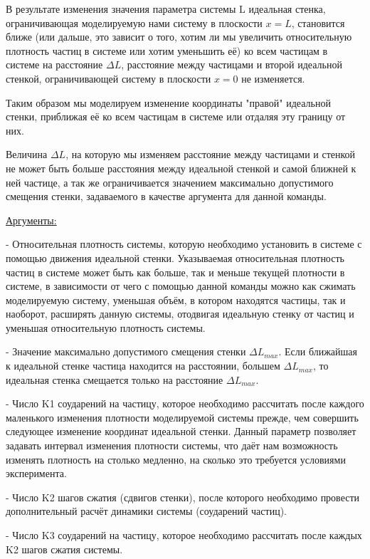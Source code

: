\documentclass[a4paper]{article}
\begin{document}
В результате изменения значения параметра системы L идеальная стенка, ограничивающая моделируемую нами систему в плоскости $ x = L $, становится ближе (или дальше, это зависит о того, хотим ли мы увеличить относительную плотность частиц в системе или хотим уменьшить её) ко всем частицам в системе на расстояние $ \Delta L $, расстояние между частицами и второй идеальной стенкой, ограничивающей систему в плоскости $ x = 0 $ не изменяется.

Таким образом мы моделируем изменение координаты "правой" идеальной стенки, приближая её ко всем частицам в системе или отдаляя эту границу от них.

Величина $ \Delta L $, на которую мы изменяем расстояние между частицами и стенкой не может быть больше расстояния между идеальной стенкой и самой ближней к ней частице, а так же ограничивается значением максимально допустимого смещения стенки, задаваемого в качестве аргумента для данной команды.

\uline{Аргументы:}

- Относительная плотность системы, которую необходимо установить в системе с помощью движения идеальной стенки. Указываемая относительная плотность частиц в системе может быть как больше, так и меньше текущей плотности в системе, в зависимости от чего с помощью данной команды можно как сжимать моделируемую систему, уменьшая объём, в котором находятся частицы, так и наоборот, расширять данную системы, отодвигая идеальную стенку от частиц и уменьшая относительную плотность системы.

- Значение максимально допустимого смещения стенки $ \Delta L_{max} $. Если ближайшая к идеальной стенке частица находится на расстоянии, большем $ \Delta L_{max} $, то идеальная стенка смещается только на расстояние $ \Delta L_{max} $.

- Число K1 соударений на частицу, которое необходимо рассчитать после каждого маленького изменения плотности моделируемой системы прежде, чем совершить следующее изменение координат идеальной стенки. Данный параметр позволяет задавать интервал изменения плотности системы, что даёт нам возможность изменять плотность на столько медленно, на сколько  это требуется условиями эксперимента.

- Число K2 шагов сжатия (сдвигов стенки), после которого необходимо провести дополнительный расчёт динамики системы (соударений частиц).

- Число K3 соударений на частицу, которое необходимо рассчитать после каждых K2 шагов сжатия системы.
\end{document}
